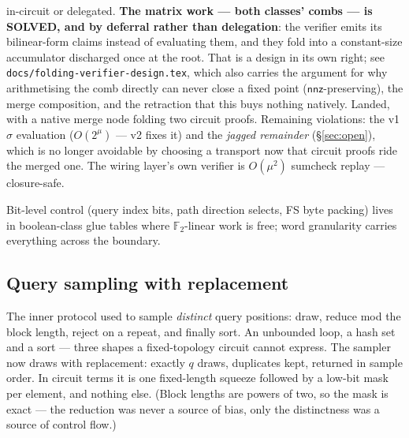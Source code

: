 \documentclass[11pt]{article}
\newcommand{\F}{\mathbb{F}}
\newcommand{\Ftwo}{\F_2}
\newcommand{\nnz}{\mathsf{nnz}}
\newcommand{\code}[1]{\texttt{#1}}
\theoremstyle{definition}
\begin{document}
\begin{enumerate}[nosep]
        in-circuit or delegated.
        \textbf{The matrix work --- both classes' combs --- is SOLVED, and
        by deferral rather than delegation}: the verifier emits its
        bilinear-form claims instead of evaluating them, and they fold into
        a constant-size accumulator discharged once at the root. That is a
        design in its own right; see
        \code{docs/folding-verifier-design.tex}, which also carries the
        argument for why arithmetising the comb directly can never close a
        fixed point ($\nnz$-preserving), the merge composition, and the
        retraction that this buys nothing natively. Landed, with a native
        merge node folding two circuit proofs.
        Remaining violations: the v1 $\sigma$ evaluation
        ($O(2^\mu)$ --- v2 fixes it) and the \emph{jagged remainder}
        (\S\ref{sec:open}), which is no longer avoidable by choosing a
        transport now that circuit proofs ride the merged one. The wiring
        layer's own verifier is $O(\mu^2)$ sumcheck replay --- closure-safe.
\end{enumerate}

Bit-level control (query index bits, path direction selects, FS byte
packing) lives in boolean-class glue tables where $\Ftwo$-linear work is
free; word granularity carries everything across the boundary.

\subsection{Query sampling with replacement}\label{sec:replacement-sampling}

The inner protocol used to sample \emph{distinct} query positions:
draw, reduce mod the block length, reject on a repeat, and finally sort.
An unbounded loop, a hash set and a sort --- three shapes a
fixed-topology circuit cannot express. The sampler now draws with
replacement: exactly $q$ draws, duplicates kept, returned in sample
order. In circuit terms it is one fixed-length squeeze followed by a
low-bit mask per element, and nothing else. (Block lengths are powers of
two, so the mask is exact --- the reduction was never a source of bias,
only the distinctness was a source of control flow.)
\end{document}
